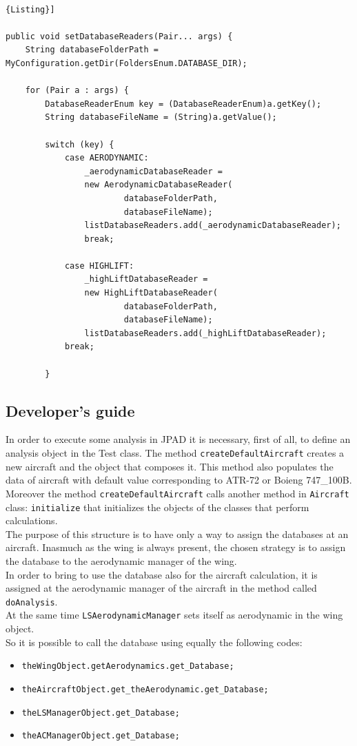 \noindent \\
\begin{lstlisting}[frame=rbl,caption={{\footnotesize \texttt{setDatabaseReaders} method}},label= [style=\bfseries]{Listing}]

public void setDatabaseReaders(Pair... args) {
	String databaseFolderPath = MyConfiguration.getDir(FoldersEnum.DATABASE_DIR);
	
	for (Pair a : args) {
		DatabaseReaderEnum key = (DatabaseReaderEnum)a.getKey(); 
		String databaseFileName = (String)a.getValue();
		
		switch (key) {
			case AERODYNAMIC:
				_aerodynamicDatabaseReader = 
				new AerodynamicDatabaseReader(
						databaseFolderPath,
						databaseFileName); 
				listDatabaseReaders.add(_aerodynamicDatabaseReader);
				break;
				
			case HIGHLIFT:
				_highLiftDatabaseReader = 
				new HighLiftDatabaseReader(
						databaseFolderPath, 
						databaseFileName); 
				listDatabaseReaders.add(_highLiftDatabaseReader);
			break;	
			
		}
\end{lstlisting}


\subsection {Developer's guide}

In order to execute some analysis in JPAD it is necessary, first of all, to define an analysis object in the Test class. The method \texttt{createDefaultAircraft} creates a new aircraft and the object that composes it. This method also populates the data of aircraft with default value corresponding to ATR-72 or Boieng 747\_100B. Moreover the method \texttt{createDefaultAircraft} calls another method in \texttt{Aircraft} class: \texttt{initialize} that initializes the objects of the classes that perform calculations. \\
The purpose of this structure is to have only a way to assign the databases at an aircraft. Inasmuch as the wing is always present, the chosen strategy is to assign the database to the aerodynamic manager of the wing.\\
In order to bring to use the database also for the aircraft calculation, it is assigned at the aerodynamic manager of the aircraft in the method called \texttt{doAnalysis}.\\
At the same time \texttt{LSAerodynamicManager} sets itself as aerodynamic in the wing object. \\
So it is possible to call the database using equally the following codes: 
\begin{itemize}
\item \texttt{theWingObject.getAerodynamics.get\_Database;}
\item \texttt{theAircraftObject.get\_theAerodynamic.get\_Database;}
\item \texttt{theLSManagerObject.get\_Database;}
\item \texttt{theACManagerObject.get\_Database;}
\end{itemize}

